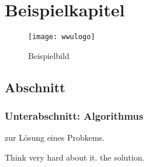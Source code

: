 \chapter{Beispielkapitel}
\label{ch:example}
\lipsum

\begin{figure}[h]
	\centering 
	\texttt{[image: wwulogo]}
	\caption{Beispielbild}
	\label{fig:example}
\end{figure}

\lipsum[1-2]

\section{Abschnitt}
\lipsum[12-13]

\subsection{Unterabschnitt: Algorithmus}
	\lipsum[1]
	
	\begin{algorithm}[H]
		\caption{zur Lösung eines Probkems.}
		\label{alg:fixedlength}
		\begin{algorithmic}[1] 
			\State Think very hard about it.
			\State \Return the solution.
			\EndIf 
			\EndFunction 
		\end{algorithmic}
	\end{algorithm}

